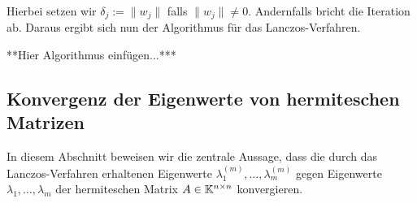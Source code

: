 \documentclass{article}
\begin{document}
Hierbei setzen wir $\delta_j := \|w_j\|$ falls $\|w_j\| \neq 0$. Andernfalls bricht die Iteration ab. Daraus ergibt sich nun der Algorithmus für das Lanczos-Verfahren.

**Hier Algorithmus einfügen...***


\subsection{Konvergenz der Eigenwerte von hermiteschen Matrizen}

In diesem Abschnitt beweisen wir die zentrale Aussage, dass die durch das Lanczos-Verfahren erhaltenen Eigenwerte $\lambda_1^{(m)},\dots,\lambda_m^{(m)}$ gegen Eigenwerte $\lambda_1,\dots,\lambda_m$ der hermiteschen Matrix $A \in \mathbb{K}^{n \times n}$ konvergieren.


\end{document}
